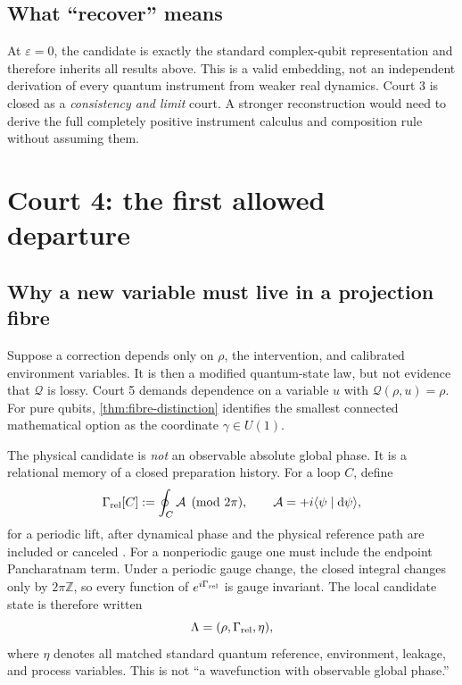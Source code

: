 \documentclass[10pt]{article}
\theoremstyle{definition}
\theoremstyle{remark}
\newcommand{\dd}{\mathrm d}
\newcommand{\cQ}{\mathcal Q}
\begin{document}
\subsection{What ``recover'' means}

At \(\varepsilon=0\), the candidate is exactly the standard complex-qubit representation and therefore inherits all results above. This is a valid embedding, not an independent derivation of every quantum instrument from weaker real dynamics. Court 3 is closed as a \emph{consistency and limit} court. A stronger reconstruction would need to derive the full completely positive instrument calculus and composition rule without assuming them.

\section{Court 4: the first allowed departure}

\subsection{Why a new variable must live in a projection fibre}

Suppose a correction depends only on \(\rho\), the intervention, and calibrated environment variables. It is then a modified quantum-state law, but not evidence that \(\cQ\) is lossy. Court 5 demands dependence on a variable \(u\) with
\(\cQ(\rho,u)=\rho\).
For pure qubits, \cref{thm:fibre-distinction} identifies the smallest connected mathematical option as the coordinate \(\gamma\in U(1)\).

The physical candidate is \emph{not} an observable absolute global phase. It is a relational memory of a closed preparation history. For a loop \(C\), define
\begin{equation}
  \Gamma_{\rm rel}[C]
  :=
  \oint_C\mathcal A
  \pmod{2\pi},
  \qquad
  \mathcal A=+i\langle\psi\mid\dd\psi\rangle ,
  \label{eq:relative-fibre}
\end{equation}
for a periodic lift, after dynamical phase and the physical reference path are included or canceled \citep{Simon1983,SamuelBhandari1988}. For a nonperiodic gauge one must include the endpoint Pancharatnam term. Under a periodic gauge change, the closed integral changes only by \(2\pi\mathbb Z\), so every function of \(e^{i\Gamma_{\rm rel}}\) is gauge invariant. The local candidate state is therefore written
\[
\Lambda=(\rho,\Gamma_{\rm rel},\eta),
\]
where \(\eta\) denotes all matched standard quantum reference, environment, leakage, and process variables. This is not ``a wavefunction with observable global phase.''
\end{document}
